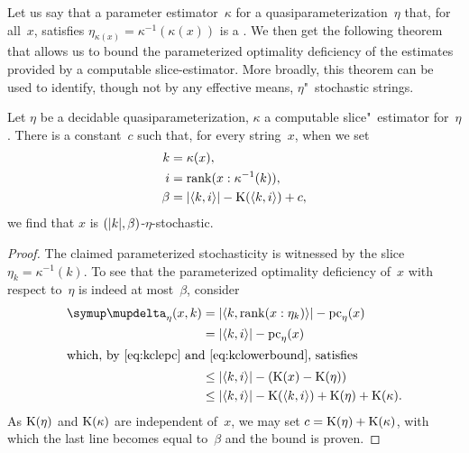 Let us say that a parameter estimator~$\kappa$ for a quasiparameterization~$\eta$ that, for all~$x$, satisfies $\eta_{\kappa(x)} = \kappa^{-1}(\kappa(x))$ is a .
We then get the following theorem that allows us to bound the parameterized optimality deficiency of the estimates provided by a computable slice-estimator.
More broadly, this theorem can be used to identify, though not by any effective means, $\eta$"~stochastic strings.
\begin{theorem}
\label{thm:etastochastic}%
  Let $\eta$ be a decidable quasiparameterization, $\kappa$ a computable slice"~estimator for~$\eta$.
  There is a constant~$c$ such that, for every string~$x$, when we set
  \begin{align*}
    k &= \kappa(x), \\
    i &= \operatorname{rank}(x : \kappa^{-1}(k)), \\
    \beta &= {\lvert{\langle k, i\rangle}\rvert} - \operatorname{K}({\langle k, i\rangle}) + c,
  \end{align*}
  we find that $x$ is $({\lvert k\rvert}, \beta)$-$\eta$-stochastic.
\end{theorem}
\begin{proof}
  The claimed parameterized stochasticity is witnessed by the slice $\eta_k = \kappa^{-1}(k)$.
  To see that the parameterized optimality deficiency of~$x$ with respect to~$\eta$ is indeed at most~$\beta$, consider
  \begin{align*}
    \updelta_\eta(x, k) &= \length{\pair{k}{\rank(x : \eta_k)}} - \pc_\eta(x) \\
      &= \length{\pair{k}{i}} - \pc_\eta(x) \\
    \intertext{which, by~\eqref{eq:kclepc} and~\eqref{eq:kclowerbound}, satisfies}
      &\le \length{\pair{k}{i}} - (\KC(x) - \KC(\eta)) \\
      &\le \length{\pair{k}{i}} - \KC(\pair{k}{i}) + \KC(\eta) + \KC(\kappa).
  \end{align*}
  As $\operatorname{K}(\eta)$ and $\operatorname{K}(\kappa)$ are independent of~$x$, we may set $c = \operatorname{K}(\eta) + \operatorname{K}(\kappa)$, with which the last line becomes equal to~$\beta$ and the bound is proven.
\end{proof}

